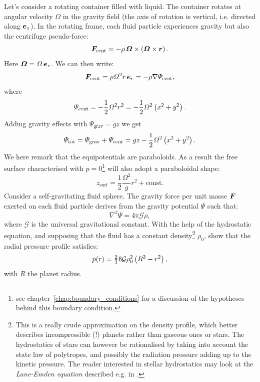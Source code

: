  Let's consider a rotating container filled with liquid. The container rotates at angular velocity $\Omega$ in the gravity field (the axis of rotation is vertical, i.e. directed along  $\matrixsym e_{z}$). In the rotating frame, each fluid particle experiences gravity but also the centrifuge pseudo-force:
\begin{equation}
\bF_\text{cent} = -\rho \,\matrixsym \Omega \times \lp \matrixsym  \Omega \times \matrixsym r\rp.
\end{equation}
Here $\matrixsym \Omega = \Omega \,\matrixsym e_{z}$. We can then write:
\begin{equation}
\bF_\text{cent} = \rho \Omega^2 r \,\matrixsym e_{r} = -\rho \nabla \Psi_\text{cent},
\end{equation}
where
\begin{equation}
\Psi_\text{cent} = -\frac{1}{2} \Omega^2 r^2 = -\frac{1}{2} \Omega^2 \left( x^2 + y^2\right).
\end{equation}
Adding gravity effects with $\Psi_\text{grav} = gz$ we get 
\begin{equation}
\Psi_\text{tot} = \Psi_\text{grav} + \Psi_\text{cent}  = gz -\frac{1}{2} \Omega^2 \left( x^2 + y^2\right).
\end{equation} 
We here remark that the equipotentials are paraboloids. As a result the free surface characterised with $p = 0$\footnote{see chapter~\ref{chap:boundary_conditions} for a discussion of the hypotheses behind this boundary condition.} will also adopt a paraboloidal shape:
\begin{equation}
z_\text{surf} = \frac{1}{2} \frac{\Omega^2}{g} r^2 + \text{const}.
\end{equation}
 Consider a self-gravitating fluid sphere. The gravity force per unit masse $\bF$ exerted on each fluid particle derives from the gravity potential $\Psi$ such that:
\begin{equation}
\nabla^2 \Psi = 4 \mathrm \pi \mathcal G \rho,
\end{equation}
where $\mathcal G$ is the universal gravitational constant. With the help of the hydrostatic equation, and supposing that the fluid has a constant density\footnote{This is a really crude approximation on the density profile, which better describes incompressible (!) planets rather than gaseous ones or stars. The hydrostatics of stars can however be rationalised by taking into account the state law of polytropes, and possibly the radiation pressure adding up to the kinetic pressure. The reader interested in stellar hydrostatics may look at the \textit{Lane-Emden equation} described e.g. in \citet[][chap. IV]{Chandrasekhar1957}.} $\rho_0$, show that the radial pressure profile satisfies:
\begin{equation}
p(r) = \tfrac{2}{3} \mathrm \pi \mathcal G \rho_0^2 \left( R^2 - r^2\right),
\end{equation}
with $R$ the planet radius.
